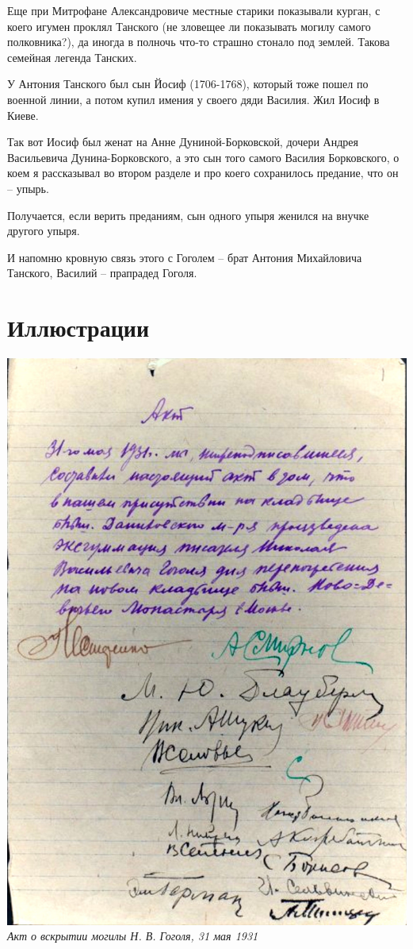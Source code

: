 \documentclass[a5paper,11pt,openany]{article}
\begin{document}
   Еще при Митрофане Александровиче местные старики показывали курган, с коего игумен проклял Танского (не зловещее ли показывать могилу самого полковника?), да иногда в полночь что-то страшно стонало под землей.   Такова семейная легенда Танских. 

У Антония Танского был сын Йосиф (1706-1768), который тоже пошел по военной линии, а потом купил имения у своего дяди Василия. Жил Иосиф в Киеве.

   Так вот Иосиф был женат на Анне Дуниной-Бор\-ковской, дочери Андрея Васильевича Дунина-Борк\-овского, а это сын того самого Василия Борков\-ского, о коем я рассказывал во втором разделе и про коего сохранилось предание, что он – упырь.

   Получается, если верить преданиям, сын одного упыря женился на внучке другого упыря. 

И напомню кровную связь этого с Гоголем – брат Антония Михайловича Танского, Василий – 
 прапрадед Гоголя.



\newpage

\section{Иллюстрации}

\vspace*{\fill}

\begin{center}
\includegraphics[width=0.95\linewidth]{act-hi-gimp.jpg}\\

\textit{Акт о вскрытии могилы Н. В. Гоголя, 31 мая 1931}
\end{center}
\end{document}
